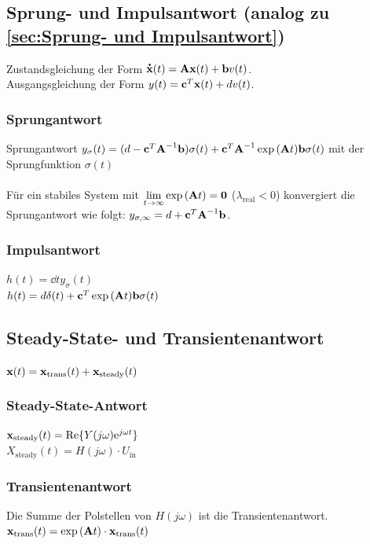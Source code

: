 \documentclass[fs, footer]{latex4ei}
\begin{document}
\begin{multicols*}{4}
    \subsection{Sprung- und Impulsantwort (analog zu \ref{sec:Sprung- und Impulsantwort})}
    Zustandsgleichung der Form $\accentset{\mbox{\textrm{\large\bfseries .}} }{\textbf{x}}(t) = \textbf{A}\textbf{x}(t)+\textbf{b}v(t)$.\\
    Ausgangsgleichung der Form $y(t) = \textbf{c}^T\textbf{x}(t) + dv(t)$.
    \subsubsection{Sprungantwort}

    Sprungantwort $y_\sigma(t) = (d-\textbf{c}^T\textbf{A}^{-1}\textbf{b})\sigma (t) + \textbf{c}^T\textbf{A}^{-1}\exp{(\textbf{A}t)}\textbf{b}\sigma(t)$ mit der Sprungfunktion $\sigma(t)$\\ \\
    Für ein stabiles System mit $\lim_{t\rightarrow\infty}\exp{(\ma At)} = \ma 0$ ($\lambda_{\text{real}} < 0$) konvergiert die Sprungantwort wie folgt: $y_{\sigma,\infty} = d + \textbf{c}^T\textbf{A}^{-1}\textbf{b}$.
    \subsubsection{Impulsantwort}
    $h(t) = \dd t y_\sigma(t)$\\
    $h(t) = d\delta (t) + \textbf{c}^T\exp{(\textbf{A}t)}\textbf{b}\sigma(t)$
    \subsection{Steady-State- und Transientenantwort}
    $\textbf{x}(t) = \textbf{x}_{\text{trans}}(t) + \textbf{x}_{\text{steady}}(t)$
    \subsubsection{Steady-State-Antwort}
    $\textbf{x}_{\text{steady}}(t) = \text{Re}\{Y(j\omega)\mathrm{e}^{j\omega t}\}$\\
    $X_{\text{steady}}(t) = H(j\omega) \cdot U_{\text{in}}$
    \subsubsection{Transientenantwort}
    Die Summe der Polstellen von $H(j\omega)$ ist die Transientenantwort.\\
    $\textbf{x}_{\text{trans}}(t) = \exp{(\textbf{A}t)} \cdot \textbf{x}_{\text{trans}}(t)$

\end{multicols*}
\end{document}
